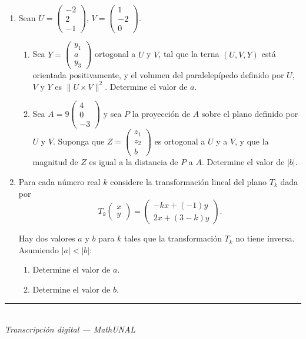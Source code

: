 \documentclass[11pt]{article}
\newcommand{\vect}[2]{\begin{pmatrix}#1\\#2\end{pmatrix}}
\newcommand{\vectiii}[3]{\begin{pmatrix}#1\\#2\\#3\end{pmatrix}}
\newcommand{\examfooter}{\vfill\rule{\linewidth}{0.4pt}\\[1pt]{\scriptsize\textit{Transcripción digital --- MathUNAL}\hfill\textcolor{unalblue}{\textbf{\thepage}}}}
\begin{document}
\begin{enumerate}
\item Sean $U=\vectiii{-2}{2}{-1}$, $V=\vectiii{1}{-2}{0}$.

\begin{enumerate}[label=(\alph*)]
\item Sea $Y=\vectiii{y_1}{a}{y_3}$ ortogonal a $U$ y $V$, tal que la terna $(U,V,Y)$ está orientada positivamente, y el volumen del paralelepípedo definido por $U$, $V$ y $Y$ es $\|U\times V\|^2$. Determine el valor de $a$.
\item Sea $A=9\vectiii{4}{0}{-3}$ y sea $P$ la proyección de $A$ sobre el plano definido por $U$ y $V$. Suponga que $Z=\vectiii{z_1}{z_2}{b}$ es ortogonal a $U$ y a $V$, y que la magnitud de $Z$ es igual a la distancia de $P$ a $A$. Determine el valor de $|b|$.
\end{enumerate}

\item Para cada número real $k$ considere la transformación lineal del plano $T_k$ dada por
$$T_k\vect{x}{y}=\vect{-kx+(-1)y}{2x+(3-k)y}.$$

Hay dos valores $a$ y $b$ para $k$ tales que la transformación $T_k$ no tiene inversa. Asumiendo $|a|<|b|$:

\begin{enumerate}[label=(\alph*)]
\item Determine el valor de $a$.
\item Determine el valor de $b$.
\end{enumerate}

\end{enumerate}

\examfooter
\end{document}
